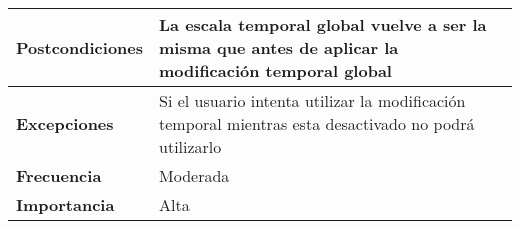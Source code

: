 \begin{tabularx}{\columnwidth}{l|l}
\begin{minipage}{0.25\columnwidth}
\textbf{Postcondiciones} 
\end{minipage}
&
\begin{minipage}{0.65\columnwidth}
La escala temporal global vuelve a ser la misma que antes de aplicar la modificación temporal global
\end{minipage}
\\ \hline

\begin{minipage}{0.25\columnwidth}
\textbf{Excepciones} 
\end{minipage}
&
\begin{minipage}{0.65\columnwidth}
Si el usuario intenta utilizar la modificación temporal mientras esta desactivado no podrá utilizarlo 
\end{minipage}
\\ \hline

\begin{minipage}{0.25\columnwidth}
\textbf{Frecuencia} 
\end{minipage}
&
\begin{minipage}{0.65\columnwidth}
Moderada
\end{minipage}
\\ \hline

\begin{minipage}{0.25\columnwidth}
\textbf{Importancia} 
\end{minipage}
&
\begin{minipage}{0.65\columnwidth}
Alta
\end{minipage}
\\ \hline
\end{tabularx}